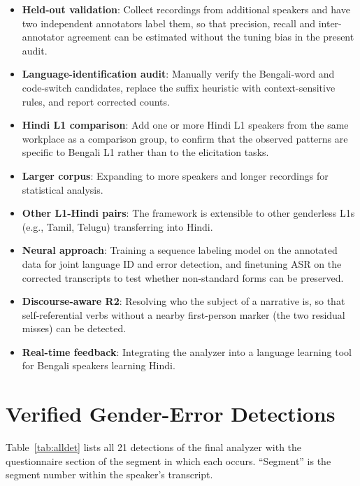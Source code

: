 \documentclass[11pt,a4paper]{report}
\begin{document}
\begin{itemize}
  \item \textbf{Held-out validation}: Collect recordings from additional speakers and have two independent annotators label them, so that precision, recall and inter-annotator agreement can be estimated without the tuning bias in the present audit.
  \item \textbf{Language-identification audit}: Manually verify the Bengali-word and code-switch candidates, replace the suffix heuristic with context-sensitive rules, and report corrected counts.
  \item \textbf{Hindi L1 comparison}: Add one or more Hindi L1 speakers from the same workplace as a comparison group, to confirm that the observed patterns are specific to Bengali L1 rather than to the elicitation tasks.
  \item \textbf{Larger corpus}: Expanding to more speakers and longer recordings for statistical analysis.
  \item \textbf{Other L1-Hindi pairs}: The framework is extensible to other genderless L1s (e.g., Tamil, Telugu) transferring into Hindi.
  \item \textbf{Neural approach}: Training a sequence labeling model on the annotated data for joint language ID and error detection, and finetuning ASR on the corrected transcripts to test whether non-standard forms can be preserved.
  \item \textbf{Discourse-aware R2}: Resolving who the subject of a narrative is, so that self-referential verbs without a nearby first-person marker (the two residual misses) can be detected.
  \item \textbf{Real-time feedback}: Integrating the analyzer into a language learning tool for Bengali speakers learning Hindi.
\end{itemize}

\appendix

\chapter{Verified Gender-Error Detections}
\label{app:detections}

Table~\ref{tab:alldet} lists all 21 detections of the final analyzer with the questionnaire section of the segment in which each occurs. ``Segment'' is the segment number within the speaker's transcript.
\end{document}
